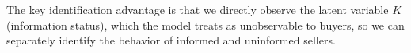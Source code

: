 The key identification advantage is that we directly observe the latent variable $K$ (information status), which the model treats as unobservable to buyers, so we can separately identify the behavior of informed and uninformed sellers.
